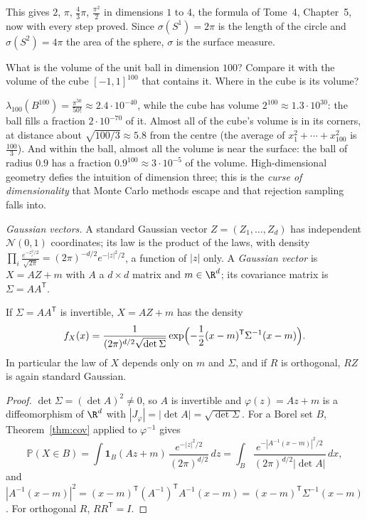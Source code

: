 This gives $2$, $\pi$, $\frac43\pi$, $\frac{\pi^2}2$ in dimensions $1$ to $4$, the formula of Tome~4, Chapter~5, now with every step proved. Since $\sigma(S^1)=2\pi$ is the length of the circle and
$\sigma(S^2)=4\pi$ the area of the sphere, $\sigma$ is the surface measure.

\begin{think}
What is the volume of the unit ball in dimension $100$? Compare it with the volume of the cube $[-1,1]^{100}$ that contains it. Where in the cube is its volume?
\end{think}

$\lambda_{100}(B^{100})=\frac{\pi^{50}}{50!}\approx2.4\cdot10^{-40}$, while the cube has volume $2^{100}\approx1.3\cdot10^{30}$: the ball fills a fraction $2\cdot10^{-70}$ of it. Almost all of the cube's volume is in its
corners, at distance about $\sqrt{100/3}\approx5.8$ from the centre (the average of $x_1^2+\cdots+x_{100}^2$ is $\frac{100}3$). And within the ball, almost all the volume is near the surface: the ball of
radius $0.9$ has a fraction $0.9^{100}\approx3\cdot10^{-5}$ of the volume. High-dimensional geometry defies the intuition of dimension three; this is the \emph{curse of dimensionality}
that Monte Carlo methods escape and that rejection sampling falls into.

\emph{Gaussian vectors.} A standard Gaussian vector $Z=(Z_1,\dots,Z_d)$ has independent $\mathcal N(0,1)$ coordinates; its law is the product of the laws, with density
$\prod_i\frac{e^{-z_i^2/2}}{\sqrt{2\pi}}=(2\pi)^{-d/2}e^{-|z|^2/2}$, a function of $|z|$ only. A \emph{Gaussian vector} is $X=AZ+m$ with $A$ a $d\times d$ matrix and $m\in\R^d$; its covariance matrix is
$\Sigma=AA^{\mathsf T}$.

\begin{theorem}\label{thm:gaussdensity}
If $\Sigma=AA^{\mathsf T}$ is invertible, $X=AZ+m$ has the density
\[f_X(x)=\frac1{(2\pi)^{d/2}\sqrt{\det\Sigma}}\exp\Bigl(-\frac12(x-m)^{\mathsf T}\Sigma^{-1}(x-m)\Bigr).\]
In particular the law of $X$ depends only on $m$ and $\Sigma$, and if $R$ is orthogonal, $RZ$ is again standard Gaussian.
\end{theorem}
\begin{proof}
$\det\Sigma=(\det A)^2\ne0$, so $A$ is invertible and $\varphi(z)=Az+m$ is a diffeomorphism of $\R^d$ with $|J_\varphi|=|\det A|=\sqrt{\det\Sigma}$. For a Borel set $B$, Theorem~\ref{thm:cov} applied to $\varphi^{-1}$ gives
\[\mathbb P(X\in B)=\int\mathbf 1_B(Az+m)\,\frac{e^{-|z|^2/2}}{(2\pi)^{d/2}}\,dz=\int_B\frac{e^{-|A^{-1}(x-m)|^2/2}}{(2\pi)^{d/2}|\det A|}\,dx,\]
and $|A^{-1}(x-m)|^2=(x-m)^{\mathsf T}(A^{-1})^{\mathsf T}A^{-1}(x-m)=(x-m)^{\mathsf T}\Sigma^{-1}(x-m)$. For orthogonal $R$, $RR^{\mathsf T}=I$.
\end{proof}

